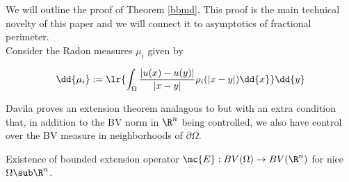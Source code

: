 \documentclass[../main.tex]{subfiles}
\begin{document}
We will outline the proof of Theorem \ref{bbmd}. This proof is the main technical novelty of this paper and we will connect it to asymptotics of fractional perimeter. \\




Consider the Radon measures $ \mu_{i} $ given by  

\[
    \dd{\mu_{i}} := \lr{\int_{\Omega}\frac{|u(x)-u(y)|}{|x-y|} \rho_{i}(|x-y|) \dd{x}}\dd{y}
\]


Davila proves an extension theorem analagous to %
but with an extra condition that, in addition to the BV norm in $ \R^{n} $ being controlled, we also have control over the BV measure in neighborhoods of $ \partial \Omega $.

\begin{proposition}
    Existence of bounded extension operator $ \mc{E}: BV(\Omega)\to BV(\R^{n}) $ for nice $ \Omega\sub \R^{n} $.
\end{proposition}




\end{document}

